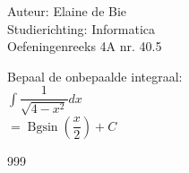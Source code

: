 \documentclass[a4paper]{article}
\begin{document}
\newcommand{\Bgsin}{\operatorname{Bgsin}}

\noindent \large Auteur: Elaine de Bie \\
\noindent \large Studierichting: Informatica\\
\noindent \large Oefeningenreeks 4A nr. 40.5\


\medskip


\normalsize


Bepaal de onbepaalde integraal: \\

$ \displaystyle\int \dfrac{1}{\sqrt{4 - x^2}} dx $\\

$ = \Bgsin\left(\dfrac{x}{2}\right) + C $ \\




\begin{thebibliography}{999}
\end{thebibliography}
\end{document}
